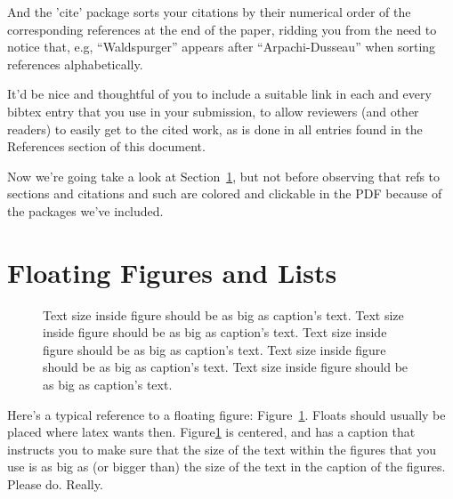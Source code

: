 \documentclass[letterpaper,twocolumn,10pt]{article}
\begin{document}
And the 'cite' package sorts your citations by their numerical order
of the corresponding references at the end of the paper, ridding you
from the need to notice that, e.g, ``Waldspurger'' appears after
``Arpachi-Dusseau'' when sorting references
alphabetically. 

It'd be nice and thoughtful of you to include a suitable link in each
and every bibtex entry that you use in your submission, to allow
reviewers (and other readers) to easily get to the cited work, as is
done in all entries found in the References section of this document.

Now we're going take a look at Section~\ref{sec:figs}, but not before
observing that refs to sections and citations and such are colored and
clickable in the PDF because of the packages we've included.

\section{Floating Figures and Lists}
\label{sec:figs}


\begin{figure}
\begin{center}
\end{center}
\caption{\label{fig:vectors} Text size inside figure should be as big as
  caption's text. Text size inside figure should be as big as
  caption's text. Text size inside figure should be as big as
  caption's text. Text size inside figure should be as big as
  caption's text. Text size inside figure should be as big as
  caption's text. }
\end{figure}


Here's a typical reference to a floating figure:
Figure~\ref{fig:vectors}. Floats should usually be placed where latex
wants then. Figure\ref{fig:vectors} is centered, and has a caption
that instructs you to make sure that the size of the text within the
figures that you use is as big as (or bigger than) the size of the
text in the caption of the figures. Please do. Really.
\end{document}
